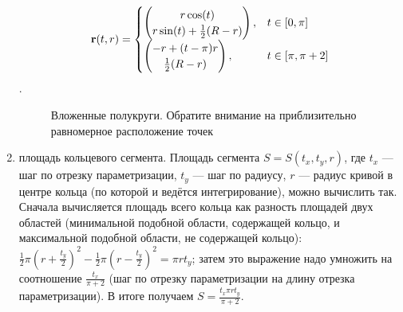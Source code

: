 \documentclass[a4paper, 12pt]{article}
\begin{document}
\begin{enumerate}
  \begin{equation}
    {\bf r}(t,r)=
    \begin{cases}
      \begin{pmatrix}
        r \cos(t)\\
        r \sin(t)+ \frac{1}{2}(R-r)
      \end{pmatrix}, & t \in [0,\pi]\\
    \begin{pmatrix}
      -r+(t-\pi)r\\
      \frac{1}{2}(R-r)
    \end{pmatrix}, & t \in [\pi,\pi+2]
  \end{cases}
  \end{equation}.
  \begin{figure}[h!]
    \noindent{}
    \caption{Вложенные полукруги. Обратите внимание на приблизительно равномерное расположение точек}
    \label{hcircp}
    \end{figure}
    
    \item { площадь кольцевого сегмента}. Площадь сегмента $S=S(t_x,t_y,r)$, где $t_x$ --- шаг по отрезку параметризации, $t_y$ --- шаг по радиусу, $r$ --- радиус кривой в центре кольца (по которой и ведётся интегрирование), можно вычислить так. Сначала вычисляется площадь всего кольца как разность площадей двух областей (минимальной подобной области, содержащей кольцо, и максимальной подобной области, не содержащей кольцо): $\frac{1}{2} \pi (r+\frac{t_y}{2})^2-\frac{1}{2} \pi (r-\frac{t_y}{2})^2=\pi r t_y$; затем это выражение надо умножить на соотношение $\frac{t_x}{\pi +2}$ (шаг по отрезку параметризации на длину отрезка параметризации). В итоге получаем $S = \frac{t_x \pi r t_y}{\pi +2}$.

\end{enumerate}
\end{document}
